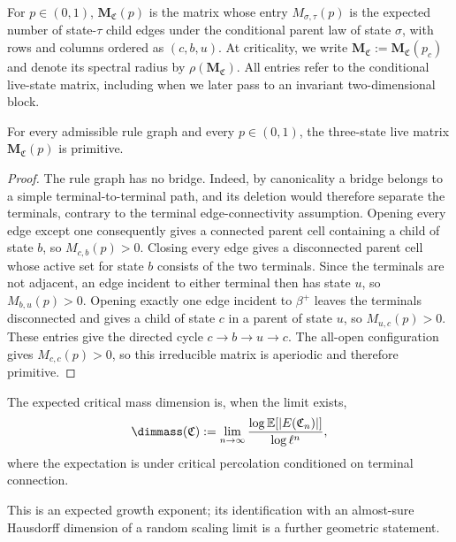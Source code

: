 \begin{definition}\label{def:live-matrix}
For $p\in(0,1)$, $\mathbf M_{\mathfrak C}(p)$ is the matrix whose entry $M_{\sigma,\tau}(p)$ is the expected number of state-$\tau$ child edges under the conditional parent law of state $\sigma$, with rows and columns ordered as $(c,b,u)$.
At criticality, we write $\mathbf M_{\mathfrak C}:=\mathbf M_{\mathfrak C}(p_c)$ and denote its spectral radius by $\rho(\mathbf M_{\mathfrak C})$.
All entries refer to the conditional live-state matrix, including when we later pass to an invariant two-dimensional block.
\end{definition}

\begin{proposition}\label{prop:live-matrix-primitive}
For every admissible rule graph and every $p\in(0,1)$, the three-state live matrix $\mathbf M_{\mathfrak C}(p)$ is primitive.
\end{proposition}

\begin{proof}
The rule graph has no bridge.
Indeed, by canonicality a bridge belongs to a simple terminal-to-terminal path, and its deletion would therefore separate the terminals, contrary to the terminal edge-connectivity assumption.
Opening every edge except one consequently gives a connected parent cell containing a child of state $b$, so $M_{c,b}(p)>0$.
Closing every edge gives a disconnected parent cell whose active set for state $b$ consists of the two terminals.
Since the terminals are not adjacent, an edge incident to either terminal then has state $u$, so $M_{b,u}(p)>0$.
Opening exactly one edge incident to $\beta^+$ leaves the terminals disconnected and gives a child of state $c$ in a parent of state $u$, so $M_{u,c}(p)>0$.
These entries give the directed cycle $c\to b\to u\to c$.
The all-open configuration gives $M_{c,c}(p)>0$, so this irreducible matrix is aperiodic and therefore primitive.
\end{proof}

\begin{definition}\label{def:critical-mass-dimension}
The expected critical mass dimension is, when the limit exists,
\[
 \dimmass(\mathfrak C):=\lim_{n\to\infty}
 \frac{\log\mathbb E[|E(\mathfrak C_n)|]}{\log\ell^n},
\]
where the expectation is under critical percolation conditioned on terminal connection.
\end{definition}
This is an expected growth exponent; its identification with an almost-sure Hausdorff dimension of a random scaling limit is a further geometric statement.

